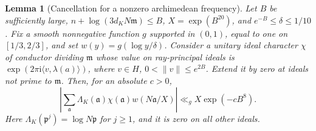 \documentclass[a4paper,11pt]{article}
\newtheorem{lemma}[proposition]{Lemma}
\theoremstyle{definition}
\theoremstyle{remark}
\numberwithin{equation}{section}
\begin{document}
\begin{lemma}[Cancellation for a nonzero archimedean frequency]
\label{lem:angular234}
Let \(B\) be sufficiently large, \(n+\log(3d_K N\mathfrak m)\le B\),
\(X=\exp(B^{20})\), and \(e^{-B}\le \delta\le1/10\). Fix a smooth
nonnegative function \(g\) supported in \((0,1)\), equal to one
on \([1/3,2/3]\), and set \(w(y)=g(\log y/\delta)\). Consider a
unitary ideal character \(\chi\) of conductor dividing \(\mathfrak m\)
whose value on ray-principal ideals is
\(\exp(2\pi\mathrm i\langle v,\lambda(a)\rangle)\), where
\(v\in H\), \(0<\|v\|\le e^{2B}\). Extend it by zero at ideals
not prime to \(\mathfrak m\). Then, for an absolute \(c>0\),
\[
 \left|\sum_{\mathfrak a}\Lambda_K(\mathfrak a)\chi(\mathfrak a)
                         w(N\mathfrak a/X)\right|
          \ll_g X\exp(-cB^8).
\]
Here \(\Lambda_K(\mathfrak p^j)=\log N\mathfrak p\) for \(j\ge1\),
and it is zero on all other ideals.
\end{lemma}
\end{document}

